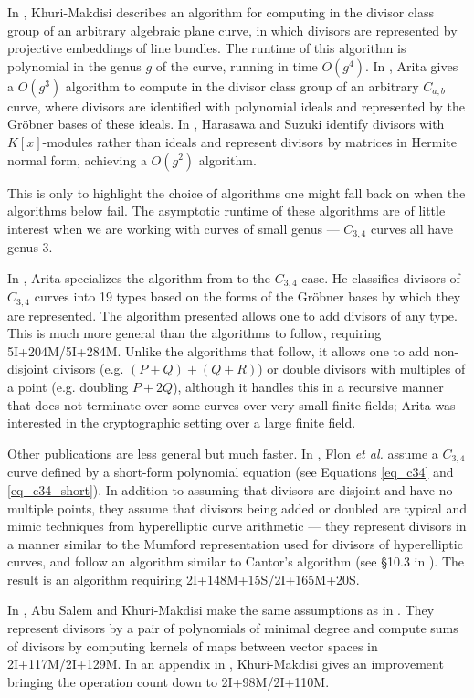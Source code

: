 In \cite{kmakdisi04}, Khuri-Makdisi describes an algorithm for computing in the divisor class group of an arbitrary algebraic plane curve,
in which divisors are represented by projective embeddings of line bundles.
The runtime of this algorithm is polynomial in the genus $g$ of the curve, running in time $O(g^4)$.
In \cite{arita99}, Arita gives a $O(g^3)$ algorithm to compute in the divisor class group of an arbitrary $C_{a,b}$ curve,
where divisors are identified with polynomial ideals and represented by the Gr\"obner bases of these ideals.
In \cite{harasawa00}, Harasawa and Suzuki identify divisors with $K[x]$-modules rather than ideals and represent divisors by matrices in Hermite normal form,
achieving a $O(g^2)$ algorithm.

This is only to highlight the choice of algorithms one might fall back on when the algorithms below fail.
The asymptotic runtime of these algorithms are of little interest when we are working with curves of small genus ---
$C_{3,4}$ curves all have genus 3.

In \cite{arita05-2}, Arita specializes the algorithm from \cite{arita99} to the $C_{3,4}$ case.
He classifies divisors of $C_{3,4}$ curves into 19 types based on the forms of the Gr\"obner bases by which they are represented.
The algorithm presented allows one to add divisors of any type.
This is much more general than the algorithms to follow, requiring 5I+204M/5I+284M.
Unlike the algorithms that follow, it allows one to add non-disjoint divisors (e.g. $(P + Q) + (Q + R)$)
or double divisors with multiples of a point (e.g. doubling $P + 2Q$),
although it handles this in a recursive manner that does not terminate over some curves over very small finite fields;
Arita was interested in the cryptographic setting over a large finite field.

Other publications are less general but much faster.
In \cite{flon08}, Flon \emph{et al.} assume a $C_{3,4}$ curve defined by a short-form polynomial equation
(see Equations \ref{eq_c34} and \ref{eq_c34_short}).
In addition to assuming that divisors are disjoint and have no multiple points, 
they assume that divisors being added or doubled are typical and mimic techniques from hyperelliptic curve arithmetic ---
they represent divisors in a manner similar to the Mumford representation used for divisors of hyperelliptic curves,
and follow an algorithm similar to Cantor's algorithm (see \S 10.3 in \cite{galbraith12}).
The result is an algorithm requiring 2I+148M+15S/2I+165M+20S.

In \cite{salem07}, Abu Salem and Khuri-Makdisi make the same assumptions as in \cite{flon08}.
They represent divisors by a pair of polynomials of minimal degree and compute sums of divisors
by computing kernels of maps between vector spaces in 2I+117M/2I+129M.
In an appendix in \cite{kmakdisi18},
Khuri-Makdisi gives an improvement bringing the operation count down to 2I+98M/2I+110M.



